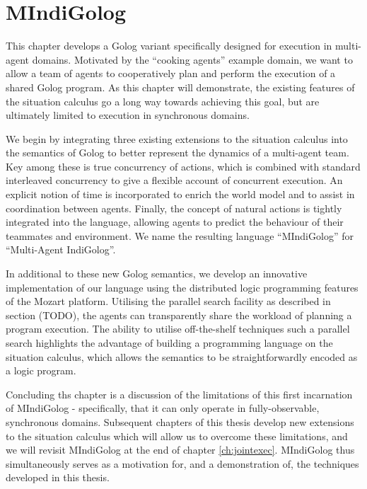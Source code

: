 

\chapter{MIndiGolog}

\label{ch:mindigolog}

This chapter develops a Golog variant specifically designed for execution
in multi-agent domains. Motivated by the {}``cooking agents'' example
domain, we want to allow a team of agents to cooperatively plan and
perform the execution of a shared Golog program. As this chapter will
demonstrate, the existing features of the situation calculus go a
long way towards achieving this goal, but are ultimately limited to
execution in synchronous domains.

We begin by integrating three existing extensions to the situation
calculus into the semantics of Golog to better represent the dynamics
of a multi-agent team. Key among these is true concurrency of actions,
which is combined with standard interleaved concurrency to give a
flexible account of concurrent execution. An explicit notion of time
is incorporated to enrich the world model and to assist in coordination
between agents. Finally, the concept of natural actions is tightly
integrated into the language, allowing agents to predict the behaviour
of their teammates and environment. We name the resulting language
{}``MIndiGolog'' for {}``Multi-Agent IndiGolog''.

In additional to these new Golog semantics, we develop an innovative
implementation of our language using the distributed logic programming
features of the Mozart platform. Utilising the parallel search facility
as described in section (TODO), the agents can transparently share
the workload of planning a program execution. The ability to utilise
off-the-shelf techniques such a parallel search highlights the advantage
of building a programming language on the situation calculus, which
allows the semantics to be straightforwardly encoded as a logic program.

Concluding ths chapter is a discussion of the limitations of this
first incarnation of MIndiGolog - specifically, that it can only operate
in fully-observable, synchronous domains. Subsequent chapters of this
thesis develop new extensions to the situation calculus which will
allow us to overcome these limitations, and we will revisit MIndiGolog
at the end of chapter \ref{ch:jointexec}. MIndiGolog thus simultaneously
serves as a motivation for, and a demonstration of, the techniques
developed in this thesis.


